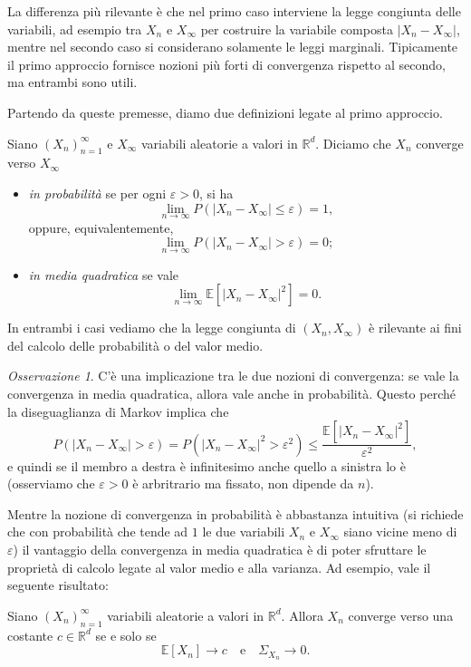 \documentclass[
  italian,
  letterpaper,
]{book}
\providecommand{\tightlist}{%
  \setlength{\itemsep}{0pt}\setlength{\parskip}{0pt}}
\newcommand{\sqa}[1]{\left[ #1 \right]}
\newcommand{\R}{\mathbb{R}}
\newcommand{\E}[1]{\mathbb{E}\sqa{#1}}
\theoremstyle{definition}
\theoremstyle{remark}
\newtheorem*{remark}{Osservazione}
\begin{document}
La differenza più rilevante è che nel primo caso interviene la legge
congiunta delle variabili, ad esempio tra \(X_n\) e \(X_\infty\) per
costruire la variabile composta \(|X_n - X_\infty|\), mentre nel secondo
caso si considerano solamente le leggi marginali. Tipicamente il primo
approccio fornisce nozioni più forti di convergenza rispetto al secondo,
ma entrambi sono utili.

Partendo da queste premesse, diamo due definizioni legate al primo
approccio.

Siano \((X_n)_{n=1}^\infty\) e \(X_\infty\) variabili aleatorie a valori
in \(\R^d\). Diciamo che \(X_n\) converge verso \(X_\infty\)

\begin{itemize}
\tightlist
\item
  \emph{in probabilità} se per ogni \(\varepsilon>0\), si ha
  \[ \lim_{n \to \infty} P( |X_n - X_\infty| \le \varepsilon) = 1,\]
  oppure, equivalentemente,
  \[ \lim_{n \to \infty} P( |X_n - X_\infty| > \varepsilon) = 0;\]
\item
  \emph{in media quadratica} se vale
  \[ \lim_{n \to \infty } \E{ |X_n - X_\infty|^2} = 0.\]
\end{itemize}

In entrambi i casi vediamo che la legge congiunta di \((X_n, X_\infty)\)
è rilevante ai fini del calcolo delle probabilità o del valor medio.

\begin{remark}
C'è una implicazione tra le due nozioni di convergenza: se vale la
convergenza in media quadratica, allora vale anche in probabilità.
Questo perché la diseguaglianza di Markov implica che
\[ P( |X_n - X_\infty| > \varepsilon)  = P( |X_n - X_\infty|^2 > \varepsilon^2 ) \le \frac{ \E{ |X_n - X_\infty|^2}}{\varepsilon^2},\]
e quindi se il membro a destra è infinitesimo anche quello a sinistra lo
è (osserviamo che \(\varepsilon>0\) è arbritrario ma fissato, non
dipende da \(n\)).
\end{remark}

Mentre la nozione di convergenza in probabilità è abbastanza intuitiva
(si richiede che con probabilità che tende ad \(1\) le due variabili
\(X_n\) e \(X_\infty\) siano vicine meno di \(\varepsilon\)) il
vantaggio della convergenza in media quadratica è di poter sfruttare le
proprietà di calcolo legate al valor medio e alla varianza. Ad esempio,
vale il seguente risultato:

Siano \((X_n)_{n=1}^\infty\) variabili aleatorie a valori in \(\R^d\).
Allora \(X_n\) converge verso una costante \(c \in \R^d\) se e solo se
\[ \E{X_n} \to c \quad \text{e} \quad \Sigma_{X_n} \to 0.\]
\end{document}
